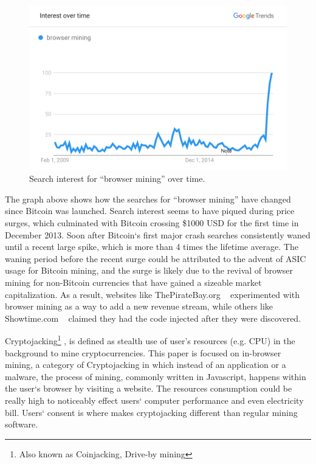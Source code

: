 \begin{figure}[t]
\centering
\includegraphics[width=\linewidth]{figures/browser_mining.png}
\caption{Search interest for ``browser mining'' over time.\label{fig:interest}}
\end{figure}

The graph above shows how the searches for ``browser mining'' have changed since Bitcoin was launched. Search interest seems to have piqued during price surges, which culminated with Bitcoin crossing \$1000 USD for the first time in December 2013. Soon after Bitcoin`s first major crash searches consistently waned until a recent large spike, which is more than 4 times the lifetime average. The waning period before the recent surge could be attributed to the advent of ASIC usage for Bitcoin mining, and the surge is likely due to the revival of browser mining for non-Bitcoin currencies that have gained a sizeable market capitalization. As a result, websites like ThePirateBay.org ~\cite{piratesbayhive} experimented with browser mining as a way to add a new revenue stream, while others like Showtime.com ~\cite{showtimehive} claimed they had the code injected after they were discovered.


Cryptojacking\footnote{Also known as Coinjacking, Drive-by mining} , is defined as stealth use of user's resources (e.g. CPU) in the background to mine cryptocurrencies. This paper is focused on in-browser mining, a category of Cryptojacking in which instead of an application or a malware, the process of mining, commonly written in Javascript, happens within the user`s browser by visiting a website. The resources consumption could be really high to noticeably effect users` computer performance and even electricity bill. Users` consent is where makes cryptojacking different than regular mining software.






